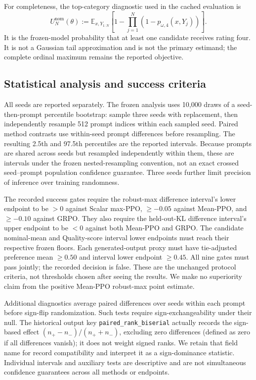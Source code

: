 For completeness, the top-category diagnostic used in the cached evaluation
is
\begin{equation}
\label{eq:any-four}
U_N^{\mathrm{nom}}(\theta)
:=\mathbb E_{x,Y_{1:N}}\!\left[
1-\prod_{j=1}^{N}(1-p_{\omega,4}(x,Y_j))\right].
\end{equation}
It is the frozen-model probability that at least one candidate receives rating
four.  It is not a Gaussian tail approximation and is not the primary
estimand; the complete ordinal maximum remains the reported objective.

\subsection{Statistical analysis and success criteria}
\label{subsec:statistical-analysis}

All seeds are reported separately. The frozen analysis uses 10,000 draws of
a seed-then-prompt percentile bootstrap: sample three seeds with replacement,
then independently resample 512 prompt indices within each sampled seed.
Paired method contrasts use within-seed prompt differences before resampling.
The resulting 2.5th and 97.5th percentiles are the reported intervals. Because
prompts are shared across seeds but resampled independently within them, these
are intervals under the frozen nested-resampling convention, not an exact
crossed seed--prompt population confidence guarantee. Three seeds further
limit precision of inference over training randomness.

The recorded success gates require the robust-max difference interval's lower
endpoint to be \(>0\) against Scalar max-PPO, \(\ge-0.05\) against
Mean-PPO, and \(\ge-0.10\) against GRPO. They also require the held-out-KL
difference interval's upper endpoint to be \(<0\) against both Mean-PPO and
GRPO. The candidate nominal-mean and Quality-score interval lower endpoints
must reach their respective frozen floors. Each generated-output proxy must
have tie-adjusted preference mean \(\ge0.50\) and interval lower endpoint
\(\ge0.45\). All nine gates must pass jointly; the recorded decision is false.
These are the unchanged protocol criteria, not thresholds chosen after seeing
the results. We make no superiority claim from the positive Mean-PPO
robust-max point estimate.

Additional diagnostics average paired differences over seeds within each
prompt before sign-flip randomization. Such tests require sign-exchangeability
under their null. The historical output key \texttt{paired\_rank\_biserial}
actually records the sign-based effect \((n_+-n_-)/(n_++n_-)\), excluding
zero differences (defined as zero if all differences vanish); it does not
weight signed ranks. We retain that field name for record compatibility and
interpret it as a sign-dominance statistic. Individual intervals and auxiliary
tests are descriptive and are not simultaneous confidence guarantees across
all methods or endpoints.

